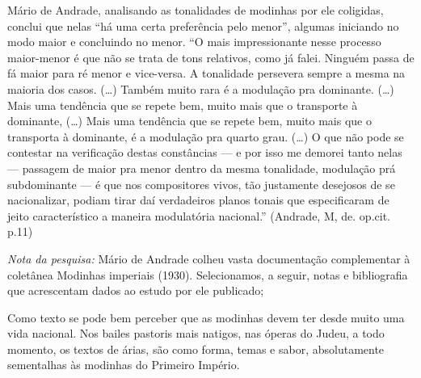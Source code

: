 Mário de Andrade, analisando as tonalidades de modinhas por ele
coligidas, conclui que nelas ``há uma certa preferência pelo menor'',
algumas iniciando no modo maior e concluindo no menor. ``O mais
impressionante nesse processo maior-menor é que não se trata de tons
relativos, como já falei. Ninguém passa de fá maior para ré menor e
vice-versa. A tonalidade persevera sempre a mesma na maioria dos casos.
(\ldots{}) Também muito rara é a modulação pra dominante. (\ldots{}) Mais uma
tendência que se repete bem, muito mais que o transporte à dominante,
(\ldots{}) Mais uma tendência que se repete bem, muito mais que o transporta
à dominante, é a modulação pra quarto grau. (\ldots{}) O que não pode se
contestar na verificação destas constâncias --- e por isso me demorei
tanto nelas --- passagem de maior pra menor dentro da mesma tonalidade,
modulação prá subdominante --- é que nos compositores vivos, tão
justamente desejosos de se nacionalizar, podiam tirar daí verdadeiros
planos tonais que especificaram de jeito característico a maneira
modulatória nacional.'' (Andrade, M, de. op.cit. p.11)

\emph{Nota da pesquisa:} Mário de Andrade colheu vasta documentação
complementar à coletânea Modinhas imperiais (1930). Selecionamos, a
seguir, notas e bibliografia que acrescentam dados ao estudo por ele
publicado;

Como texto se pode bem perceber que as modinhas devem ter desde muito
uma vida nacional. Nos bailes pastoris mais natigos, nas óperas do
Judeu, a todo momento, os textos de árias, são como forma, temas e
sabor, absolutamente sementalhas às modinhas do Primeiro Império.

